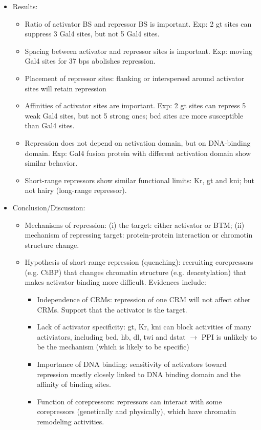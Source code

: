 \documentclass{report}
\begin{document}
\begin{enumerate}
\begin{itemize}
		\item Results:
		\begin{itemize}
			\item Ratio of activator BS and repressor BS is important. Exp: 2 gt sites can suppress 3 Gal4 sites, but not 5 Gal4 sites. 
			\item Spacing between activator and repressor sites is important. Exp: moving Gal4 sites for 37 bps abolishes repression. 
			\item Placement of repressor sites: flanking or interspersed around activator sites will retain repression
			\item Affinities of activator sites are important. Exp: 2 gt sites can repress 5 weak Gal4 sites, but not 5 strong ones; bcd sites are more susceptible than Gal4 sites. 
			\item Repression does not depend on activation domain, but on DNA-binding domain. Exp: Gal4 fusion protein with different activation domain show similar behavior. 
			\item Short-range repressors show similar functional limits: Kr, gt and kni; but not hairy (long-range repressor). 
		\end{itemize}
		
		\item Conclusion/Discussion:
		\begin{itemize}
			\item Mechanisms of repression: (i) the target: either activator or BTM; (ii) mechanism of repressing target: protein-protein interaction or chromotin structure change. 
			\item Hypothesis of short-range repression (quenching): recruiting corepressors (e.g. CtBP) that changes chromatin structure (e.g. deacetylation) that makes activator binding more difficult. Evidences include: 
			\begin{itemize}
				\item Independence of CRMs: repression of one CRM will not affect other CRMs. Support that the activator is the target. 
				\item Lack of activator specificity: gt, Kr, kni can block activities of many activiators, including bcd, hb, dl, twi and dstat $\rightarrow$ PPI is unlikely to be the mechanism (which is likely to be specific)
				\item Importance of DNA binding: sensitivity of activators toward repression mostly closely linked to DNA binding domain and the affinity of binding sites. 
				\item Function of corepressors: repressors can interact with some corepressors (genetically and physically), which have chromatin remodeling activities. 
			\end{itemize}
		\end{itemize}
	\end{itemize}
	

\end{enumerate}
\end{document}
